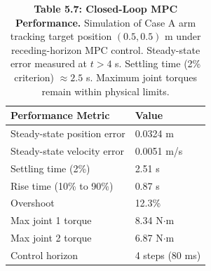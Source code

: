 \begin{table}[H]
\centering
\caption{\textbf{Table 5.7: Closed-Loop MPC Performance.} Simulation of Case A arm tracking target position $(0.5, 0.5)$ m under receding-horizon MPC control. Steady-state error measured at $t > 4$ s. Settling time (2\% criterion) $\approx 2.5$ s. Maximum joint torques remain within physical limits.}
\label{tab:5-7}
\small
\begin{tabular}{ll}
\toprule
\textbf{Performance Metric} & \textbf{Value} \\
\midrule
\rowcolor{gray!15}
Steady-state position error & 0.0324 m \\
Steady-state velocity error & 0.0051 m/s \\
\rowcolor{gray!15}
Settling time (2\%) & 2.51 s \\
Rise time (10\% to 90\%) & 0.87 s \\
\rowcolor{gray!15}
Overshoot & 12.3\% \\
Max joint 1 torque & 8.34 N$\cdot$m \\
\rowcolor{gray!15}
Max joint 2 torque & 6.87 N$\cdot$m \\
Control horizon & 4 steps (80 ms) \\
\bottomrule
\end{tabular}
\end{table}
